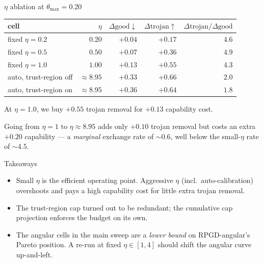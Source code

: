\documentclass[10pt,aspectratio=169]{beamer}
\newcommand{\thmax}{\theta_{\max}}
\begin{document}
\begin{frame}{$\eta$ ablation at $\thmax = 0.20$}
\centering
\small
\begin{tabular}{l r r r r}
\toprule
\textbf{cell} & $\eta$ & $\Delta\text{good}\downarrow$ & $\Delta\text{trojan}\uparrow$ & $\Delta\text{trojan} / \Delta\text{good}$ \\
\midrule
fixed $\eta = 0.2$        & $0.20$           & $+0.04$ & $+0.17$ & $\mathbf{4.6}$ \\
fixed $\eta = 0.5$        & $0.50$           & $+0.07$ & $+0.36$ & $\mathbf{4.9}$ \\
fixed $\eta = 1.0$        & $1.00$           & $+0.13$ & $+0.55$ & $\mathbf{4.3}$ \\
auto, trust-region off    & $\approx\!8.95$  & $+0.33$ & $+0.66$ & $2.0$ \\
auto, trust-region on     & $\approx\!8.95$  & $+0.36$ & $+0.64$ & $1.8$ \\
\bottomrule
\end{tabular}

\medskip
\normalsize
At $\eta = 1.0$, we buy $+0.55$ trojan removal for $+0.13$ capability cost.

\medskip
Going from $\eta = 1$ to $\eta \approx 8.95$ adds only $+0.10$ trojan removal but costs an extra $+0.20$ capability --- a \emph{marginal} exchange rate of $\sim 0.6$, well below the small-$\eta$ rate of $\sim 4.5$.
\end{frame}

\begin{frame}{Takeaways}
\begin{itemize}
\item Small $\eta$ is the efficient operating point. Aggressive $\eta$ (incl.\ auto-calibration) overshoots and pays a high capability cost for little extra trojan removal.
\item The trust-region cap turned out to be redundant; the cumulative cap projection enforces the budget on its own.
\item The angular cells in the main sweep are a \emph{lower bound} on RPGD-angular's Pareto position. A re-run at fixed $\eta \in [1, 4]$ should shift the angular curve up-and-left.
\end{itemize}
\end{frame}
\end{document}
